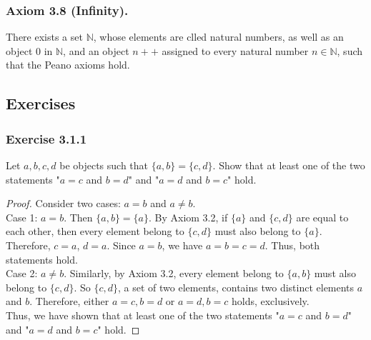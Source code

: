 \documentclass[12pt, letter]{article}
\begin{document}
\subsubsection*{Axiom 3.8 (Infinity).}
There exists a set $\mathbb{N}$, whose elements are clled natural numbers, as well as an object 0 in $\mathbb{N}$, and an object $n++$ assigned to every natural number $n\in\mathbb{N}$, 
such that the Peano axioms hold.



\subsection*{Exercises}
\subsubsection*{Exercise 3.1.1}
Let $a,b,c,d$ be objects such that $\{a,b\}=\{c,d\}$. Show that at least one of the two statements "$a=c$ and $b=d$" and "$a=d$ and $b=c$" hold.
\begin{proof}
    Consider two cases: $a=b$ and $a\ne b$.\\
    Case 1: $a=b$. Then $\{a,b\}=\{a\}$. By Axiom 3.2, if $\{a\}$ and $\{c,d\}$ are equal to each other, then every element belong to $\{c,d\}$ must also belong to $\{a\}$. 
    Therefore, $c=a$, $d=a$. Since $a=b$, we have $a=b=c=d$. Thus, both statements hold.\\
    Case 2: $a\ne b$. Similarly, by Axiom 3.2, every element belong to $\{a,b\}$ must also belong to $\{c,d\}$. So $\{c,d\}$, a set of two elements, contains two distinct elements $a$ and $b$. Therefore, 
    either $a=c, b=d$ or $a=d, b=c$ holds, exclusively.\\
    Thus, we have shown that at least one of the two statements "$a=c$ and $b=d$" and "$a=d$ and $b=c$" hold.
\end{proof}
\end{document}
